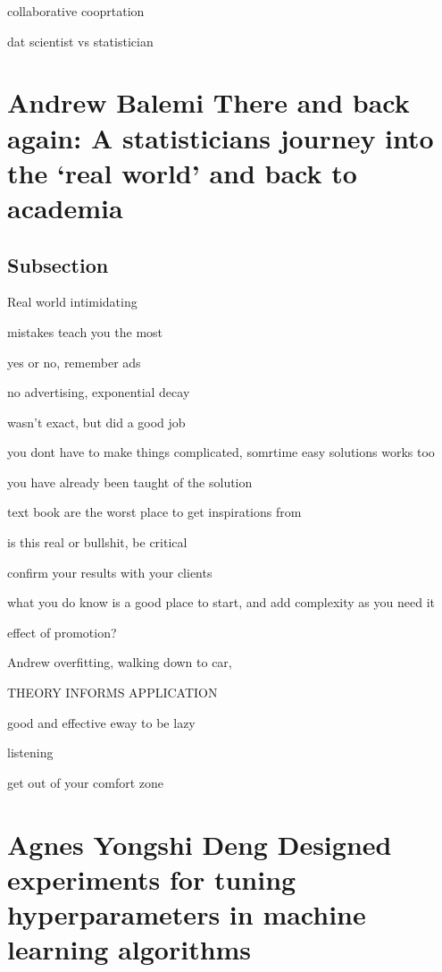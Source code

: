\documentclass[
]{book}
\begin{document}
collaborative cooprtation

dat scientist vs statistician

\hypertarget{andrew-balemi-there-and-back-again-a-statisticians-journey-into-the-real-world-and-back-to-academia}{%
\chapter*{Andrew Balemi \textbar{} There and back again: A statisticians journey into the `real world' and back to academia}\label{andrew-balemi-there-and-back-again-a-statisticians-journey-into-the-real-world-and-back-to-academia}}

\hypertarget{subsection}{%
\section{Subsection}\label{subsection}}

Real world intimidating

mistakes teach you the most

yes or no, remember ads

no advertising, exponential decay

wasn't exact, but did a good job

you dont have to make things complicated, somrtime easy solutions works too

you have already been taught of the solution

text book are the worst place to get inspirations from

is this real or bullshit, be critical

confirm your results with your clients

what you do know is a good place to start, and add complexity as you need it

effect of promotion?

Andrew overfitting, walking down to car,

THEORY INFORMS APPLICATION

good and effective eway to be lazy

listening

get out of your comfort zone

\hypertarget{agnes-yongshi-deng-designed-experiments-for-tuning-hyperparameters-in-machine-learning-algorithms}{%
\chapter*{Agnes Yongshi Deng \textbar{} Designed experiments for tuning hyperparameters in machine learning algorithms}\label{agnes-yongshi-deng-designed-experiments-for-tuning-hyperparameters-in-machine-learning-algorithms}}
\end{document}
